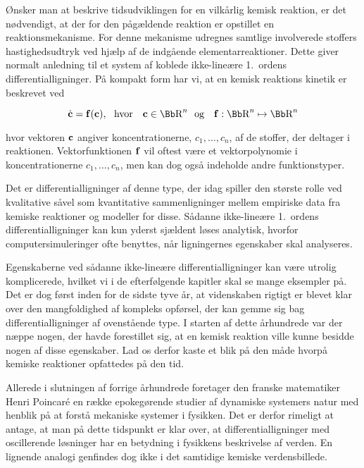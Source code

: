 \vspace{4.0mm}
{\O}nsker man at beskrive tidsudviklingen for en
vilk{\aa}rlig kemisk reaktion, er det n{\o}dvendigt, at der
for den p{\aa}g{\ae}ldende reaktion er opstillet en
reaktions\-mekanisme. For denne mekanisme udregnes samtlige
involverede stoffers ha\-stig\-heds\-udtryk ved hj{\ae}lp
af de indg{\aa}ende elementarreaktioner. Dette giver
normalt anledning til et system af koblede ikke-line{\ae}re
1.~ordens differentiallig\-ninger. P{\aa} kompakt form har
vi, at en kemisk reaktions kinetik er beskrevet ved

\begin{equation}
  \dot{\bf c} = {\bf f}({\bf c}),
  \ms{hvor} {\bf c} \in \R^n 
  \ms{og} {\bf f}: \R^n \mapsto \R^n
  \label{eq:GeneralRateEq}
\end{equation}

hvor vektoren ${\bf c}$ angiver koncentrationerne,
$c_1,\ldots,c_n$, af de stoffer, der deltager i reaktionen.
Vektorfunktionen ${\bf f}$ vil oftest v{\ae}re et
vektorpolynomie i koncentrationerne $c_1,\ldots, c_n$, men
kan dog ogs{\aa} indeholde andre funktionstyper. 

\vspace{4.0mm}
Det er differentiallig\-ninger af denne type, der idag
spiller den st{\o}rste rolle ved kvalitative s{\aa}vel som
kvantitative sammenlig\-ninger mellem empiriske data fra
kemiske reaktioner og modeller for disse. S{\aa}danne
ikke-line{\ae}re 1.\ ordens differentiallig\-ninger kan kun
yderst sj{\ae}ldent l{\o}ses analytisk, hvorfor
computer\-simuleringer ofte benyttes, n{\aa}r lig\-ningernes
egen\-skaber skal analyseres.

\vspace{4.0mm}
Egenskaberne ved s{\aa}danne ikke-line{\ae}re
differentiallig\-ninger kan v{\ae}re utrolig komplicerede,
hvilket vi i de efterf{\o}lgende kapitler skal se mange
eksempler p{\aa}. Det er dog f{\o}rst inden for de sidste
tyve {\aa}r, at videnskaben rigtigt er blevet klar over den
mangfoldighed af kompleks opf{\o}rsel, der kan gemme sig
bag differentiallig\-ninger af ovenst{\aa}ende type. I
starten af dette {\aa}rhundrede var der n{\ae}ppe nogen,
der havde forestillet sig, at en kemisk reaktion ville
kunne besidde nogen af disse egen\-skaber. Lad os derfor
kaste et blik p{\aa} den m{\aa}de hvorp{\aa} kemiske
reaktioner opfattedes p{\aa} den tid.

\vspace{4.0mm}
Allerede i slutningen af forrige {\aa}rhundrede foretager
den franske matematiker Henri Poincar\'{e} en r{\ae}kke
epokeg{\o}rende studier af dynamiske systemers natur
\cite{PoinOrig} med henblik p{\aa} at forst{\aa} mekaniske
systemer i fysikken. Det er derfor rimeligt at antage, at
man p{\aa} dette tidspunkt er klar over, at
differentiallig\-ninger med oscillerende l{\o}sninger har
en betydning i fysikkens beskrivelse af verden. En lignende
analogi genfindes dog ikke i det samtidige kemiske
verdensbillede.

